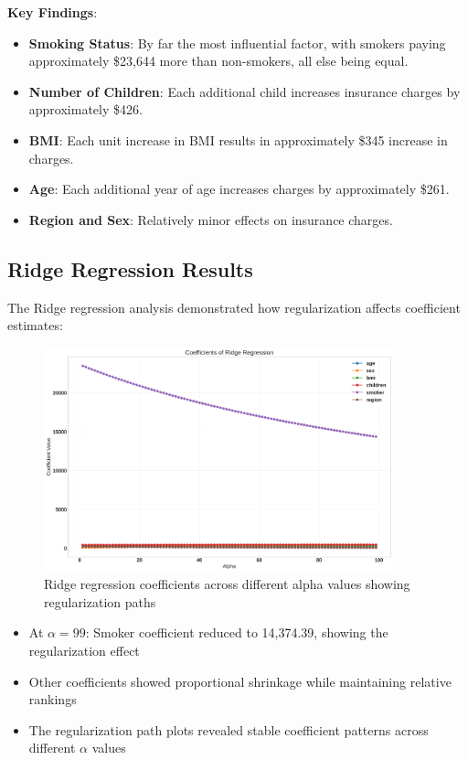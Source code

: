 \documentclass[12pt,a4paper]{article}
\begin{document}
\textbf{Key Findings}:
\begin{itemize}
    \item \textbf{Smoking Status}: By far the most influential factor, with smokers paying approximately \$23,644 more than non-smokers, all else being equal.
    \item \textbf{Number of Children}: Each additional child increases insurance charges by approximately \$426.
    \item \textbf{BMI}: Each unit increase in BMI results in approximately \$345 increase in charges.
    \item \textbf{Age}: Each additional year of age increases charges by approximately \$261.
    \item \textbf{Region and Sex}: Relatively minor effects on insurance charges.
\end{itemize}

\newpage
\subsection{Ridge Regression Results}

The Ridge regression analysis demonstrated how regularization affects coefficient estimates:

\begin{figure}[H]
\centering
\includegraphics[width=0.9\textwidth]{ridge_regression_coefficients.png}
\caption{Ridge regression coefficients across different alpha values showing regularization paths}
\label{fig:ridge_regression_coefficients}
\end{figure}

\begin{itemize}
    \item At $\alpha = 99$: Smoker coefficient reduced to 14,374.39, showing the regularization effect
    \item Other coefficients showed proportional shrinkage while maintaining relative rankings
    \item The regularization path plots revealed stable coefficient patterns across different $\alpha$ values
\end{itemize}
\end{document}

